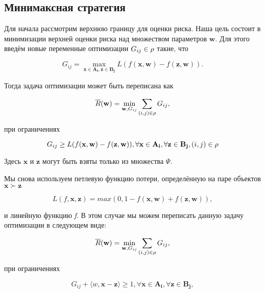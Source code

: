 \documentclass[12pt,a4paper,oneside]{article}
\begin{document}

\subsection{Минимаксная стратегия}

\par
Для начала рассмотрим верхнюю границу для оценки риска. 
Наша цель состоит в минимизации верхней оценки риска над множеством параметров \(\mathbf{w}\). 
Для этого введём новые переменные оптимизации \(G_{ij} \in \mathrm{\rho}\) такие, что

\[
G_{ij} = \underset{\mathbf{x} \in \mathbf{A_i}, \mathbf{z} \in \mathbf{B_j}}{\operatorname{max}} L (f (\mathbf{x}, \mathbf{w}) - f(\mathbf{z}, \mathbf{w})). 
\]

\par
Тогда задача оптимизации может быть переписана как

\[
\overline{R}(\mathbf{w}) = \underset{\mathbf{w}, G_{ij}}{\operatorname{min}} \sum \limits_{(i, j) \in \mathrm{\rho}} G_{ij},
\]

\par
при ограничениях

\[
G_{ij} \geq L (f(\mathbf{x}, \mathbf{w}) - f(\mathbf{z}, \mathbf{w})), \forall \mathbf{x} \in \mathbf{A_i}, \forall \mathbf{z} \in \mathbf{B_j}, (i, j) \in \mathrm{\rho}
\]

\par
Здесь \(\mathbf{x}\) и \(\mathbf{z}\) могут быть взяты только из множества \(\Psi\). 

\par
Мы снова используем петлевую функцию потери, определённую на паре объектов \(\mathbf{x} \succ \mathbf{z}\)

\[
L(f, \mathbf{x}, \mathbf{z}) = max (0,1 - f(\mathbf{x}, \mathbf{w}) + f(\mathbf{z}, \mathbf{w})),
\]

\par
и линейную функцию \emph{f}. 
В этом случае мы можем переписать данную задачу оптимизации в следующем виде:

\[
\overline{R}(\mathbf{w}) = \underset{\mathbf{w}, G_{ij}}{\operatorname{min}} \sum \limits_{(i, j) \in \mathrm{\rho}} G_{ij},
\]

\par
при ограничениях

\[
G_{ij} + \langle w, \mathbf{x} - \mathbf{z} \rangle \geq 1, \forall \mathbf{x} \in \mathbf{A_i}, \forall \mathbf{z} \in \mathbf{B_j}, 
\]
\end{document}
